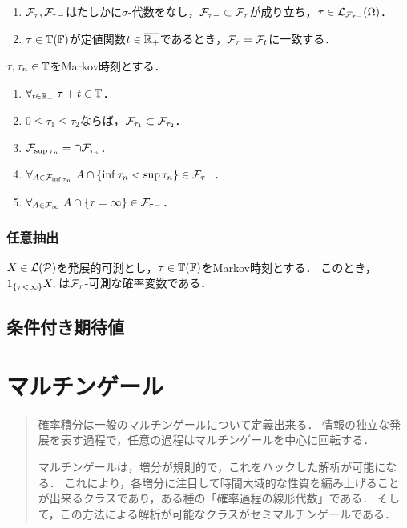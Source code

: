 \documentclass[uplatex,dvipdfmx]{jsreport}
\begin{document}
\begin{lemma}\mbox{}
    \begin{enumerate}
        \item $\mathcal{F}_\tau,\mathcal{F}_{\tau-}$はたしかに$\sigma$-代数をなし，$\mathcal{F}_{\tau-}\subset\mathcal{F}_\tau$が成り立ち，$\tau\in\mathcal{L}_{\mathcal{F}_{\tau-}}(\Omega)$．
        \item $\tau\in\mathbb{T}(\mathbb{F})$が定値関数$t\in\overline{\mathbb{R}_+}$であるとき，$\mathcal{F}_\tau=\mathcal{F}_t$に一致する．
    \end{enumerate}
\end{lemma}

\begin{proposition}[Markov時刻の情報系の性質]
    $\tau,\tau_n\in\mathbb{T}$をMarkov時刻とする．
    \begin{enumerate}
        \item $\forall_{t\in\mathbb{R}_+}\;\tau+t\in\mathbb{T}$．
        \item $0\le\tau_1\le\tau_2$ならば，$\mathcal{F}_{\tau_1}\subset\mathcal{F}_{\tau_2}$．
        \item $\mathcal{F}_{\sup\tau_n}=\cap\mathcal{F}_{\tau_n}$．
        \item $\forall_{A\in\mathcal{F}_{\inf\tau_n}}\;A\cap\left\{\inf\tau_n<\sup\tau_n\right\}\in\mathcal{F}_{\tau-}$．
        \item $\forall_{A\in\mathcal{F}_\infty}\;A\cap\left\{\tau=\infty\right\}\in\mathcal{F}_{\tau-}$．
    \end{enumerate}
\end{proposition}

\subsection{任意抽出}

\begin{proposition}
    $X\in\mathcal{L}(\mathcal{P})$を発展的可測とし，$\tau\in\mathbb{T}(\mathbb{F})$をMarkov時刻とする．
    このとき，$1_{\left\{\tau<\infty\right\}}X_\tau$は$\mathcal{F}_\tau$-可測な確率変数である．
\end{proposition}

\section{条件付き期待値}

\chapter{マルチンゲール}

\begin{quotation}
    確率積分は一般のマルチンゲールについて定義出来る．
    情報の独立な発展を表す過程で，任意の過程はマルチンゲールを中心に回転する．

    マルチンゲールは，増分が規則的で，これをハックした解析が可能になる．
    これにより，各増分に注目して時間大域的な性質を編み上げることが出来るクラスであり，ある種の「確率過程の線形代数」である．
    そして，この方法による解析が可能なクラスがセミマルチンゲールである．
\end{quotation}
\end{document}
